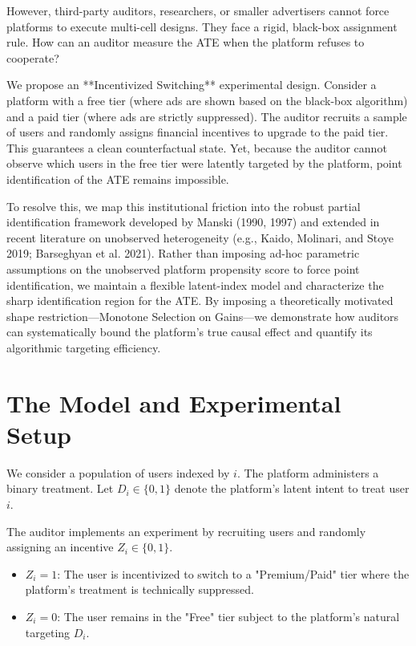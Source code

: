 \documentclass[11pt]{article}
\begin{document}
However, third-party auditors, researchers, or smaller advertisers cannot force platforms to execute multi-cell designs. They face a rigid, black-box assignment rule. How can an auditor measure the ATE when the platform refuses to cooperate?

We propose an **Incentivized Switching** experimental design. Consider a platform with a free tier (where ads are shown based on the black-box algorithm) and a paid tier (where ads are strictly suppressed). The auditor recruits a sample of users and randomly assigns financial incentives to upgrade to the paid tier. This guarantees a clean counterfactual state. Yet, because the auditor cannot observe which users in the free tier were latently targeted by the platform, point identification of the ATE remains impossible.

To resolve this, we map this institutional friction into the robust partial identification framework developed by Manski (1990, 1997) and extended in recent literature on unobserved heterogeneity (e.g., Kaido, Molinari, and Stoye 2019; Barseghyan et al. 2021). Rather than imposing ad-hoc parametric assumptions on the unobserved platform propensity score to force point identification, we maintain a flexible latent-index model and characterize the sharp identification region for the ATE. By imposing a theoretically motivated shape restriction---Monotone Selection on Gains---we demonstrate how auditors can systematically bound the platform's true causal effect and quantify its algorithmic targeting efficiency.

\section{The Model and Experimental Setup}
We consider a population of users indexed by $i$. The platform administers a binary treatment. Let $D_i \in \{0,1\}$ denote the platform's latent intent to treat user $i$. 

The auditor implements an experiment by recruiting users and randomly assigning an incentive $Z_i \in \{0,1\}$. 
\begin{itemize}
    \item $Z_i = 1$: The user is incentivized to switch to a "Premium/Paid" tier where the platform's treatment is technically suppressed.
    \item $Z_i = 0$: The user remains in the "Free" tier subject to the platform's natural targeting $D_i$.
\end{itemize}
\end{document}
